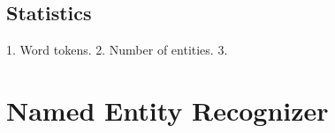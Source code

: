 \documentclass[11pt]{article}
\begin{document}
\subsection{Statistics}

1. Word tokens. 2. Number of entities. 3. 










\section{Named Entity Recognizer}
\label{sec: named entity recognizer}
\end{document}

